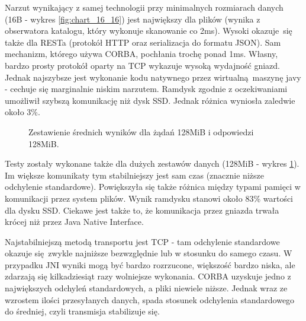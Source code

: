 Narzut wynikający z samej technologii przy minimalnych rozmiarach danych (16B - wykres \ref{fig:chart_16_16}) jest największy dla plików (wynika z obserwatora katalogu, który wykonuje skanowanie co 2ms). Wysoki okazuje się także dla RESTa (protokół HTTP oraz serializacja do formatu JSON). Sam mechanizm, którego używa CORBA, pochłania trochę ponad 1ms. Własny, bardzo prosty protokół oparty na TCP wykazuje wysoką wydajność gniazd.
Jednak najszybsze jest wykonanie kodu natywnego przez wirtualną maszynę javy - cechuje się marginalnie niskim narzutem.
Ramdysk zgodnie z oczekiwaniami umożliwił szybszą komunikację niż dysk SSD. Jednak różnica wyniosła zaledwie około 3\%.
 

\begin{figure}[H]
\caption{Zestawienie średnich wyników dla żądań 128MiB i odpowiedzi 128MiB.}
\label{fig:chart_134217728_134217728}
\end{figure}

Testy zostały wykonane także dla dużych zestawów danych (128MiB - wykres \ref{fig:chart_134217728_134217728}). Im większe komunikaty tym stabilniejszy jest sam czas (znacznie niższe odchylenie standardowe).
Powiększyła się także różnica między typami pamięci w komunikacji przez system plików. Wynik ramdysku stanowi około 83\% wartości dla dysku SSD.
Ciekawe jest także to, że komunikacja przez gniazda trwała krócej niż przez Java Native Interface.

Najstabilniejszą metodą transportu jest TCP - tam odchylenie standardowe okazuje się zwykle najniższe bezwzględnie lub w stosunku do samego czasu. W przypadku JNI wyniki mogą być bardzo rozrzucone, większość bardzo niska, ale zdarzają się kilkadziesiąt razy wolniejsze wykonania.
CORBA uzyskuje jedno z największych odchyleń standardowych, a pliki niewiele niższe. Jednak wraz ze wzrostem ilości przesyłanych danych, spada stosunek odchylenia standardowego do średniej, czyli transmisja stabilizuje się.

